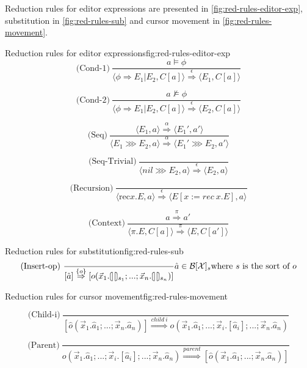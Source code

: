 Reduction rules for editor expressions are presented in \cref{fig:red-rules-editor-exp}, substitution in \cref{fig:red-rules-sub} and cursor movement in \cref{fig:red-rules-movement}.

\begin{myfigure}{Reduction rules for editor expressions}{fig:red-rules-editor-exp}
    \[
        \text{(Cond-1)} \ \frac{a \models \phi}{\langle \phi \Rightarrow E_1|E_2, C[a] \rangle \stackrel{\epsilon}{\Rightarrow} \langle E_1, C[a] \rangle}
    \]

    \[
        \text{(Cond-2)} \ \frac{a \not\models \phi}{\langle \phi \Rightarrow E_1|E_2, C[a] \rangle \stackrel{\epsilon}{\Rightarrow} \langle E_2, C[a] \rangle}
    \]

    \[
        \text{(Seq)} \ \frac{\langle E_1,a \rangle \stackrel{\alpha}{\Rightarrow} \langle E_1',a' \rangle}{\langle E_1 \ggg E_2,a \rangle \stackrel{\alpha}{\Rightarrow} \langle E_1' \ggg E_2,a' \rangle}
    \]

    \[
        \text{(Seq-Trivial)} \ \frac{}{\langle nil \ggg E_2,a \rangle \stackrel{\epsilon}{\Rightarrow} \langle E_2, a \rangle}
    \]

    \[
        \text{(Recursion)} \ \frac{}{\langle \text{rec} x.E,a \rangle \stackrel{\epsilon}{\Rightarrow} \langle E[x:= rec \ x.E],a \rangle}
    \]

    \[
        \text{(Context)} \ \frac{a \stackrel{\pi}{\Rightarrow} a'}{\langle \pi.E,C[a] \rangle \stackrel{\pi}{\Rightarrow} \langle E,C[a'] \rangle}
    \]
\end{myfigure}

\begin{myfigure}{Reduction rules for substitution}{fig:red-rules-sub}
    \[
        \text{(Insert-op)} \ \frac{}{[\hat{a}] \stackrel{\{ o \}}{\Rightarrow} [o(\vec{x}_1.\hole_{s_1};...;\vec{x}_n.\hole_{s_n})]} \hat{a} \in \mathcal{B}[\mathcal{X}]_s \text{where } s \text{ is the sort of } o
    \]
\end{myfigure}

\begin{myfigure}{Reduction rules for cursor movement}{fig:red-rules-movement}

    \[
        \text{(Child-i)} \ \frac{}{[\hat{o}(\vec{x}_1.\hat{a}_1;...;\vec{x}_n.\hat{a}_n)] \stackrel{child \ i}{\Rightarrow} o(\vec{x}_1.\hat{a}_1;...;\vec{x}_i.[\hat{a}_i];...;\vec{x}_n.\hat{a}_n)}
    \]

    \[
        \text{(Parent)} \ \frac{}{o(\vec{x}_1.\hat{a}_1;...;\vec{x}_i.[\hat{a}_i];...;\vec{x}_n.\hat{a}_n) \stackrel{parent}{\Rightarrow} [\hat{o}(\vec{x}_1.\hat{a}_1;...;\vec{x}_n.\hat{a}_n)]}
    \]
\end{myfigure}

